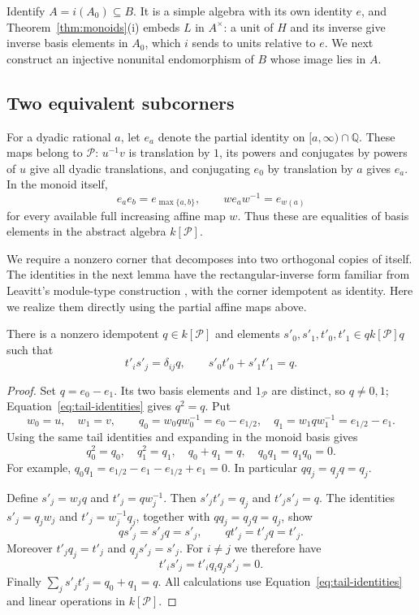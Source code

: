 Identify \(A=i(A_0)\subseteq B\).  It is a simple algebra with its own
identity \(e\), and Theorem~\ref{thm:monoids}(i) embeds
\(L\) in \(A^\times\): a unit of \(H\) and its inverse
give inverse basis elements in \(A_0\), which \(i\) sends to units
relative to \(e\).  We next construct an injective nonunital
endomorphism of \(B\) whose image lies in \(A\).

\subsection{Two equivalent subcorners}

For a dyadic rational \(a\), let \(e_a\) denote the partial identity
on \([a,\infty)\cap\mathbb Q\).  These maps belong to \(\mathcal P\):
\(u^{-1}v\) is translation by \(1\), its powers and conjugates by
powers of \(u\) give all dyadic translations, and conjugating \(e_0\)
by translation by \(a\) gives \(e_a\).  In the monoid itself,
\begin{equation}\label{eq:tail-identities}
 e_a e_b=e_{\max\{a,b\}},\qquad
 w e_a w^{-1}=e_{w(a)}
\end{equation}
for every available full increasing affine map \(w\).  Thus these
are equalities of basis elements in the abstract algebra
\(k[\mathcal P]\).

We require a nonzero corner that decomposes into two orthogonal copies
of itself. The identities in the next lemma have the rectangular-inverse
form familiar from Leavitt's module-type construction
\cite[Section~3]{Leavitt1962}, with the corner idempotent as identity.
Here we realize them directly using the partial affine maps above.

\begin{lemma}\label{lem:binary-tail-corner}
There is a nonzero idempotent \(q\in k[\mathcal P]\) and elements
\(s'_0,s'_1,t'_0,t'_1\in qk[\mathcal P]q\) such that
\[
 t'_i s'_j=\delta_{ij}q,\qquad
 s'_0t'_0+s'_1t'_1=q.
\]
\end{lemma}

\begin{proof}
Set \(q=e_0-e_1\).  Its two basis elements and \(1_{\mathcal P}\)
are distinct, so \(q\ne0,1\);
Equation~\eqref{eq:tail-identities} gives \(q^2=q\).  Put
\[
 w_0=u,\quad w_1=v,\qquad
 q_0=w_0qw_0^{-1}=e_0-e_{1/2},\quad
 q_1=w_1qw_1^{-1}=e_{1/2}-e_1.
\]
Using the same tail identities and expanding in the monoid basis gives
\[
 q_0^2=q_0,\quad q_1^2=q_1,\quad q_0+q_1=q,
 \quad q_0q_1=q_1q_0=0.
\]
For example,
\(q_0q_1=e_{1/2}-e_1-e_{1/2}+e_1=0\).
In particular \(qq_j=q_jq=q_j\).

Define \(s'_j=w_jq\) and \(t'_j=qw_j^{-1}\).  Then
\(s'_jt'_j=q_j\) and \(t'_js'_j=q\).  The identities
\(s'_j=q_jw_j\) and \(t'_j=w_j^{-1}q_j\), together with
\(qq_j=q_jq=q_j\), show
\[
 qs'_j=s'_jq=s'_j,\qquad qt'_j=t'_jq=t'_j.
\]
Moreover \(t'_jq_j=t'_j\) and \(q_js'_j=s'_j\).  For \(i\ne j\)
we therefore have
\[
 t'_is'_j=t'_iq_iq_js'_j=0.
\]
Finally \(\sum_j s'_jt'_j=q_0+q_1=q\).  All calculations use
Equation~\eqref{eq:tail-identities} and linear operations in
\(k[\mathcal P]\).
\end{proof}

